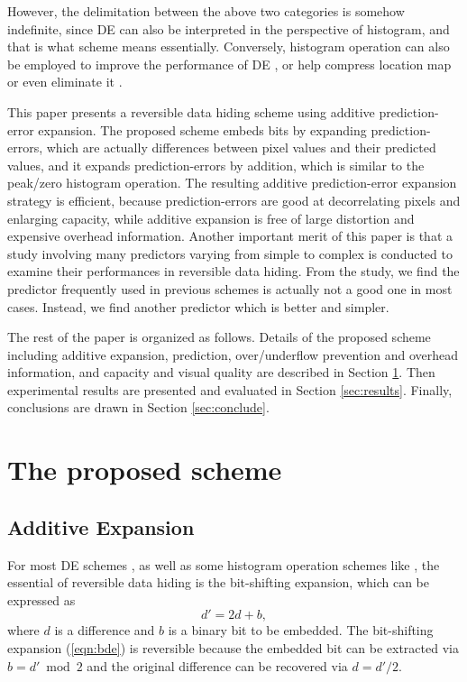 \documentclass{sig-alternate}
\begin{document}
However, the delimitation between the above two categories is somehow indefinite, since DE can also
be interpreted in the perspective of histogram, and that is what scheme \cite{Kim08hist} means
essentially. Conversely, histogram operation can also be employed to improve the performance of DE
\cite{Tseng08deextended}, or help compress location map \cite{Chang07letter} or even eliminate it
\cite{Thodi07pee,Kim08hist,Hu2009}.

This paper presents a reversible data hiding scheme using additive prediction-error expansion. The
proposed scheme embeds bits by expanding prediction-errors, which are actually differences between
pixel values and their predicted values, and it expands prediction-errors by addition, which is
similar to the peak/zero histogram operation. The resulting additive prediction-error expansion
strategy is efficient, because prediction-errors are good at decorrelating pixels and enlarging
capacity, while additive expansion is free of large distortion and expensive overhead information.
Another important merit of this paper is that a study involving many predictors varying from simple
to complex is conducted to examine their performances in reversible data hiding. From the study, we
find the predictor frequently used in previous schemes \cite{Thodi07pee,Kuribayashi08,Hu2009} is
actually not a good one in most cases. Instead, we find another predictor which is better and
simpler.

The rest of the paper is organized as follows. Details of the proposed scheme including additive
expansion, prediction, over/underflow prevention and overhead information, and capacity and visual
quality are described in Section \ref{sec:ape}. Then experimental results are presented and
evaluated in Section \ref{sec:results}. Finally, conclusions are drawn in Section
\ref{sec:conclude}.

\section{The proposed scheme}\label{sec:ape}
\subsection{Additive Expansion}\label{sub:ae}
For most DE schemes
\cite{Tian03de,Tseng08deextended,Alattar04deip,Kim08ifs,Lin08,Thodi07pee,Kuribayashi08,Hu2009}, as
well as some histogram operation schemes like \cite{Kim08hist}, the essential of reversible data
hiding is the bit-shifting expansion, which can be expressed as
\begin{equation}\label{eqn:bde}
  d' = 2d + b,
\end{equation}
where $d$ is a difference and $b$ is a binary bit to be embedded. The bit-shifting expansion
(\ref{eqn:bde}) is reversible because the embedded bit can be extracted via $b = d' \bmod 2$ and the
original difference can be recovered via $d = d' / 2$.
\end{document}
